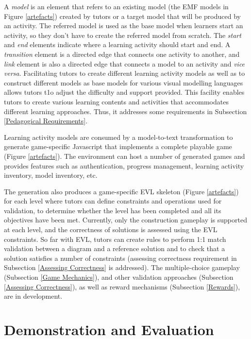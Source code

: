 \documentclass[12pt, a4paper]{report} \usepackage[titletoc]{appendix}
\begin{document}
A \emph{model} is an element that refers to an existing model (the EMF models in Figure \ref{artefacts}) created by tutors or a target model that will be produced by an activity. The referred model is used as the base model when learners start an activity, so they don't have to create the referred model from scratch. The \emph{start} and \emph{end} elements indicate where a learning activity should start and end. A \emph{transition} element is a directed edge that connects one activity to another, and \emph{link} element is also a directed edge that connects a model to an activity and \textit{vice versa}. Facilitating tutors to create different learning activity models as well as to construct different models as base models for various visual modelling languages allows tutors t1o adjust the difficulty and support provided. This facility enables tutors to create various learning contents and activities that accommodates different learning approaches. Thus, it addresses some requirements in Subsection \ref{Pedagogical Requirements}.

Learning activity models are consumed by a model-to-text transformation to generate game-specific Javascript that implements a complete playable game (Figure \ref{artefacts}). The environment can host a number of generated games and provides features such as authentication, progress management, learning activity inventory, model inventory, etc. 

The generation also produces a game-specific EVL skeleton (Figure \ref{artefacts}) for each level where tutors can define constraints and operations used for validation, to determine whether the level has been completed and all its objectives have been met. Currently, only the construction gameplay is supported at each level, and the correctness of solutions is assessed using the EVL constraints. So far with EVL, tutors can create rules to perform 1:1 match validation between a diagram and a reference solution and to check that a solution satisfies a number of constraints (assessing correctness requirement in Subsection \ref{Assessing Correctness} is addressed). The multiple-choice gameplay (Subsection \ref{Game Mechanics}), and other validation approaches (Subsection \ref{Assessing Correctness}), as well as reward mechanisms (Subsection \ref{Rewards}), are in development. 


\section{Demonstration and Evaluation}
\end{document}
